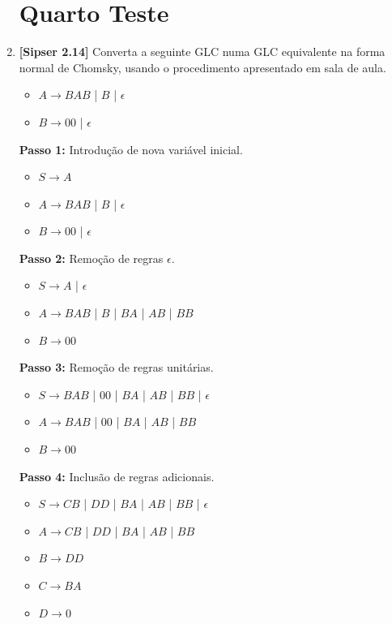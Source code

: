 \documentclass[12pt,a4paper,oneside]{article}
\begin{document}
\begin{enumerate}
	
	\section*{Quarto Teste}
	
	\item {\bf [Sipser 2.14]}  Converta a seguinte GLC numa GLC equivalente na forma normal de Chomsky,
	usando o procedimento apresentado em sala de aula.
	\begin{itemize}
		\item[] $A \rightarrow BAB$ | $B$ | $\epsilon$
		\item[] $B \rightarrow 00$ | $\epsilon$
	\end{itemize}
	
	\vspace*{0.3cm}
	
	{\color{blue}
		{\bf Passo 1:} Introdução de nova variável inicial.
		\begin{itemize}
			\item[] $S \rightarrow A$
			\item[] $A \rightarrow BAB$ | $B$ | $\epsilon$
			\item[] $B \rightarrow 00$ | $\epsilon$
		\end{itemize}
		
		{\bf Passo 2:} Remoção de regras $\epsilon$.
		\begin{itemize}
			\item[] $S \rightarrow A$ | $\epsilon$
			\item[] $A \rightarrow BAB$ | $B$ | $BA$ | $AB$ | $BB$
			\item[] $B \rightarrow 00$
		\end{itemize}
		
		{\bf Passo 3:} Remoção de regras unitárias.
		\begin{itemize}
			\item[] $S \rightarrow BAB$ | $00$ | $BA$ | $AB$ | $BB$ | $\epsilon$
			\item[] $A \rightarrow BAB$ | $00$ | $BA$ | $AB$ | $BB$
			\item[] $B \rightarrow 00$
		\end{itemize}
		
		{\bf Passo 4:} Inclusão de regras adicionais.
		\begin{itemize}
			\item[] $S \rightarrow CB$ | $DD$ | $BA$ | $AB$ | $BB$ | $\epsilon$
			\item[] $A \rightarrow CB$ | $DD$ | $BA$ | $AB$ | $BB$
			\item[] $B \rightarrow DD$
			\item[] $C \rightarrow BA$
			\item[] $D \rightarrow 0$
		\end{itemize}
	}
	

\end{enumerate}
\end{document}
